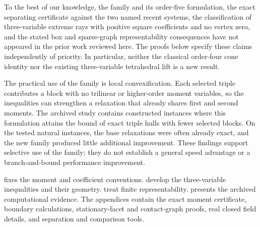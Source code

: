 To the best of our knowledge, the family and its order-five formulation,
the exact separating certificate against the two named recent systems,
the classification of three-variable extreme rays with positive square
coefficients and no vertex zero, and the
stated box and sparse-graph representability consequences have
not appeared in the prior work reviewed here. The proofs below specify
these claims independently of priority. In particular, neither the
classical order-four cone identity nor the existing three-variable
tetrahedral lift is a new result.

The practical use of the family is local convexification. Each selected
triple contributes a block with no trilinear or higher-order moment
variables, so the inequalities can strengthen a relaxation that already
shares first and second moments. The archived study contains constructed
instances where this formulation attains the bound of exact triple hulls
with fewer selected blocks. On the tested natural instances, the base
relaxations were often already exact, and the new family produced little
additional improvement. These findings support selective use of the
family; they do not establish a general speed advantage or a
branch-and-bound performance improvement.

 fixes the moment and coefficient conventions.
 develop the
three-variable inequalities and their geometry.
 treat finite representability.
 presents the archived computational evidence.
The appendices contain the exact moment certificate, boundary calculations,
stationary-facet and contact-graph proofs, real closed field details, and
separation and comparison tools.
